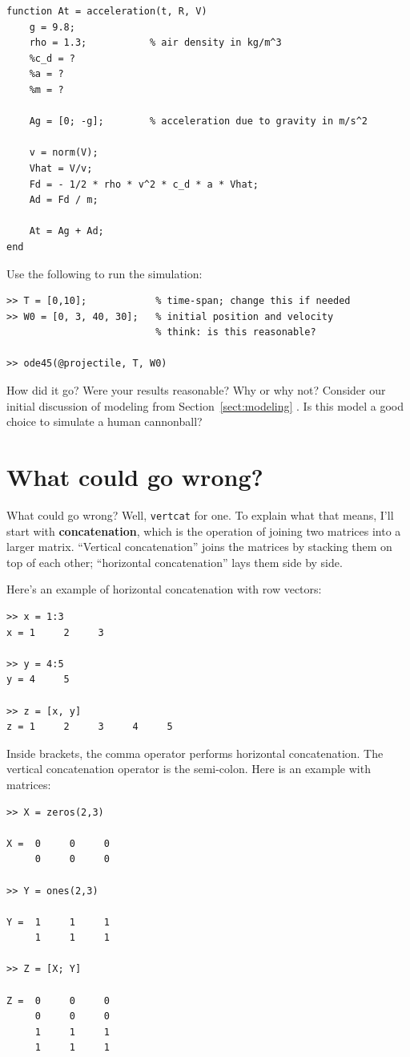 \documentclass[
]{book}
\begin{document}
\begin{verbatim}
function At = acceleration(t, R, V)
    g = 9.8;             
    rho = 1.3;           % air density in kg/m^3
    %c_d = ?
    %a = ?
    %m = ?

    Ag = [0; -g];        % acceleration due to gravity in m/s^2

    v = norm(V);
    Vhat = V/v;
    Fd = - 1/2 * rho * v^2 * c_d * a * Vhat;
    Ad = Fd / m;

    At = Ag + Ad;
end
\end{verbatim}

Use the following to run the simulation:

\begin{verbatim}
>> T = [0,10];            % time-span; change this if needed
>> W0 = [0, 3, 40, 30];   % initial position and velocity
                          % think: is this reasonable?

>> ode45(@projectile, T, W0)
\end{verbatim}

How did it go? Were your results reasonable? Why or why not? Consider our
initial discussion of modeling from Section~\ref{sect:modeling} . Is this
model a good choice to simulate a human cannonball?

\section{What could go wrong?}

What could go wrong?  Well, {\tt vertcat} for one.  To explain
what that means, I'll start with {\bf concatenation}, which is
the operation of joining two matrices into a larger matrix.
``Vertical concatenation'' joins the matrices by stacking them on
top of each other; ``horizontal concatenation'' lays them
side by side.

Here's an example of horizontal concatenation with row vectors:

\begin{verbatim}
>> x = 1:3
x = 1     2     3

>> y = 4:5
y = 4     5

>> z = [x, y]
z = 1     2     3     4     5
\end{verbatim}

Inside brackets, the comma operator performs horizontal concatenation.
The vertical concatenation operator is the semi-colon.  Here is an
example with matrices:

\begin{verbatim}
>> X = zeros(2,3)

X =  0     0     0
     0     0     0

>> Y = ones(2,3)

Y =  1     1     1
     1     1     1

>> Z = [X; Y]

Z =  0     0     0
     0     0     0
     1     1     1
     1     1     1
\end{verbatim}
\end{document}
